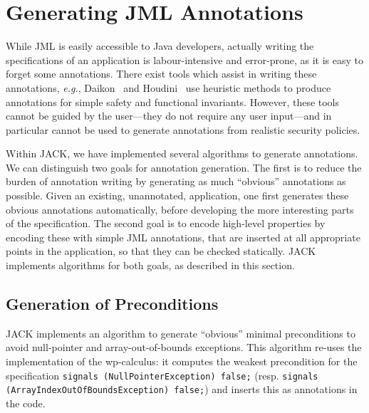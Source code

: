 
\section{Generating JML Annotations}\label{SecAnnotGen}

While JML is easily accessible to Java developers, actually writing
the specifications of an application is labour-intensive and
error-prone, as it is easy to forget some annotations. There exist
tools which assist in writing these annotations,
\emph{e.g.}, Daikon~\cite{ErnstCGN01} and Houdini~\cite{FlanaganL01}
use heuristic methods to produce annotations for simple safety and
functional invariants.  However, these tools cannot be guided by the
user---they do not require any user input---and in particular cannot
be used to generate annotations from realistic security policies.

Within JACK, we have implemented several algorithms to generate
annotations. We can distinguish two goals for annotation
generation. The first is to reduce the burden of annotation writing by
generating as much ``obvious'' annotations as possible. Given an
existing, unannotated, application, one first generates these obvious
annotations automatically, before developing the more interesting
parts of the specification. The second goal is to encode high-level
properties by encoding these with simple JML annotations, that are
inserted at all appropriate points in the application, so that they
can be checked statically.  JACK implements algorithms for both goals,
as described in this section.


\subsection{Generation of Preconditions}


JACK implements an algorithm to generate ``obvious'' minimal
preconditions to avoid null-pointer and array-out-of-bounds
exceptions. This algorithm re-uses the implementation of the
wp-calculus: it computes the weakest precondition for the
specification
\texttt{signals (NullPointerException) false;} (resp. \texttt{signals
(ArrayIndexOutOfBoundsException) false;}) and inserts this as 
annotations in the code.

